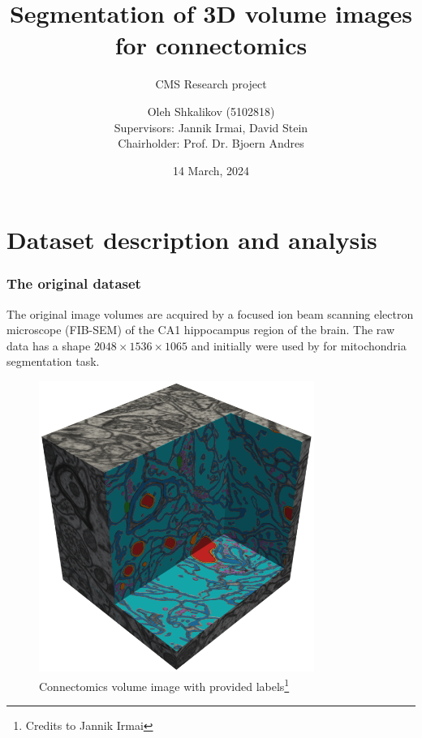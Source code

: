 \documentclass{beamer}
\title[Connectomics segmentation]{Segmentation of 3D volume images for connectomics}
\subtitle{CMS Research project}
\author[Oleh Shkalikov]{Oleh Shkalikov\texorpdfstring{ (5102818)
\\[0.7em]{\small Supervisors: Jannik Irmai, David Stein}
\\{\small Chairholder: Prof. Dr. Bjoern Andres}}{}}
\institute[TU Dresden]{TU Dresden, MLCV chair}
\date{14 March, 2024}
\begin{document}
\frame{\titlepage}


\section{Dataset description and analysis}
\begin{frame}
    \frametitle{The original dataset}
    \begin{minipage}{0.49\textwidth}
        The original image volumes are acquired by a focused ion beam scanning electron microscope (FIB-SEM)
        of the CA1 hippocampus region of the brain.
        The raw data has a shape \( 2048 \times 1536 \times 1065 \) and initially were used by
        \cite{lucchi2013learning,lucchi2011supervoxel} for mitochondria segmentation task.
    \end{minipage}
    \begin{minipage}{0.49\textwidth}
        \centering
        \begin{figure}
            \includegraphics[width=0.8\textwidth]{cube_labeled.png}
            \caption{Connectomics volume image with provided labels\footnote{Credits to Jannik Irmai}}
        \end{figure}
    \end{minipage}
\end{frame}
\end{document}
